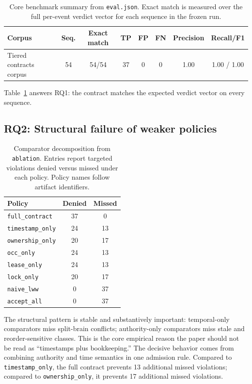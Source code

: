 \documentclass[11pt]{article}
\newcommand{\CorpusSeqCount}{54}
\newcommand{\BenchmarkTP}{37}
\newcommand{\BenchmarkFP}{0}
\newcommand{\BenchmarkFN}{0}
\newcommand{\BenchmarkPrecision}{1.00}
\newcommand{\BenchmarkRecall}{1.00}
\newcommand{\BenchmarkFOne}{1.00}
\begin{document}
\begin{table}[t]
\centering
\caption{Core benchmark summary from \texttt{eval.json}. Exact match is measured over the full per-event verdict vector for each sequence in the frozen run.}
\label{tab:summary}
\begin{tabular}{lccccccc}
\toprule
Corpus & Seq. & Exact match & TP & FP & FN & Precision & Recall/F1 \\
\midrule
Tiered contracts corpus & \CorpusSeqCount{} & \CorpusSeqCount{}/\CorpusSeqCount{} & \BenchmarkTP{} & \BenchmarkFP{} & \BenchmarkFN{} & \BenchmarkPrecision{} & \BenchmarkRecall{} / \BenchmarkFOne{} \\
\bottomrule
\end{tabular}
\end{table}

Table~\ref{tab:summary} answers RQ1: the contract matches the expected verdict vector on every sequence.

\subsection{RQ2: Structural failure of weaker policies}

\begin{table}[t]
\centering
\caption{Comparator decomposition from \texttt{ablation}. Entries report targeted violations denied versus missed under each policy. Policy names follow artifact identifiers.}
\label{tab:comparators}
\begin{tabular}{lcc}
\toprule
Policy & Denied & Missed \\
\midrule
\texttt{full\_contract} & 37 & 0 \\
\texttt{timestamp\_only} & 24 & 13 \\
\texttt{ownership\_only} & 20 & 17 \\
\texttt{occ\_only} & 24 & 13 \\
\texttt{lease\_only} & 24 & 13 \\
\texttt{lock\_only} & 20 & 17 \\
\texttt{naive\_lww} & 0 & 37 \\
\texttt{accept\_all} & 0 & 37 \\
\bottomrule
\end{tabular}
\end{table}

The structural pattern is stable and substantively important: temporal-only comparators miss split-brain conflicts; authority-only comparators miss stale and reorder-sensitive classes. This is the core empirical reason the paper should not be read as ``timestamps plus bookkeeping.'' The decisive behavior comes from combining authority and time semantics in one admission rule.
Compared to \texttt{timestamp\_only}, the full contract prevents 13 additional missed violations; compared to \texttt{ownership\_only}, it prevents 17 additional missed violations.
\end{document}

